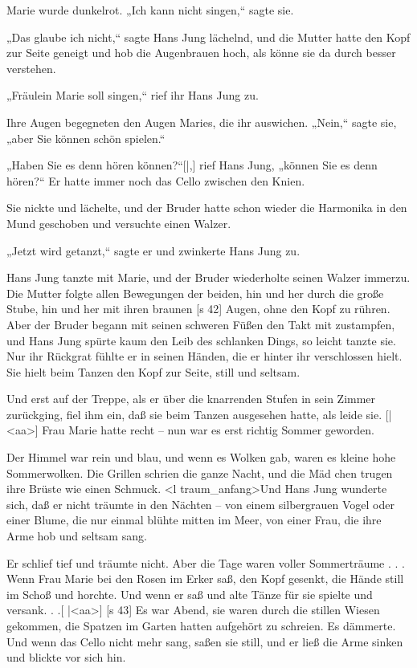 Marie wurde dunkelrot. „Ich kann nicht singen,“
sagte sie.

„Das glaube ich nicht,“ sagte Hans Jung lächelnd,
und die Mutter hatte den Kopf zur Seite geneigt
und hob die Augenbrauen hoch, als könne sie da­
durch besser verstehen.

„Fräulein Marie soll singen,“ rief ihr Hans
Jung zu.

Ihre Augen begegneten den Augen Maries, die
ihr auswichen. „Nein,“ sagte sie, „aber Sie können
schön spielen.“

„Haben Sie es denn hören können?“[|,] rief Hans
Jung, „können Sie es denn hören?“ Er hatte immer
noch das Cello zwischen den Knien.

Sie nickte und lächelte, und der Bruder hatte
schon wieder die Harmonika in den Mund geschoben
und versuchte einen Walzer.

„Jetzt wird getanzt,“ sagte er und zwinkerte
Hans Jung zu.

Hans Jung tanzte mit Marie, und der Bruder
wiederholte seinen Walzer immerzu. Die Mutter
folgte allen Bewegungen der beiden, hin und her durch
die große Stube, hin und her mit ihren braunen
[s 42]
Augen, ohne den Kopf zu rühren. Aber der Bruder
begann mit seinen schweren Füßen den Takt mit­
zustampfen, und Hans Jung spürte kaum den Leib
des schlanken Dings, so leicht tanzte sie. Nur ihr
Rückgrat fühlte er in seinen Händen, die er hinter
ihr verschlossen hielt. Sie hielt beim Tanzen den Kopf
zur Seite, still und seltsam.

Und erst auf der Treppe, als er über die
knarrenden Stufen in sein Zimmer zurückging, fiel
ihm ein, daß sie beim Tanzen ausgesehen hatte, als
leide sie.
[|<aa>]
Frau Marie hatte recht – nun war es erst
richtig Sommer geworden.

Der Himmel war rein und blau, und wenn es
Wolken gab, waren es kleine hohe Sommerwolken.
Die Grillen schrien die ganze Nacht, und die Mäd­
chen trugen ihre Brüste wie einen Schmuck. <l traum_anfang>Und
Hans Jung wunderte sich, daß er nicht träumte in
den Nächten – von einem silbergrauen Vogel oder
einer Blume, die nur einmal blühte mitten im Meer,
von einer Frau, die ihre Arme hob und seltsam sang.

Er schlief tief und träumte nicht. Aber die Tage
waren voller Sommerträume . . . Wenn Frau Marie
bei den Rosen im Erker saß, den Kopf gesenkt, die
Hände still im Schoß und horchte. Und wenn er
saß und alte Tänze für sie spielte und versank. . .[
|<aa>]
[s 43]
Es war Abend, sie waren durch die stillen
Wiesen gekommen, die Spatzen im Garten hatten
aufgehört zu schreien. Es dämmerte. Und wenn das
Cello nicht mehr sang, saßen sie still, und er ließ die
Arme sinken und blickte vor sich hin.

